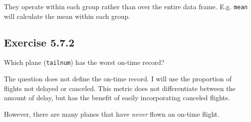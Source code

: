 \documentclass[]{book}
\newenvironment{Shaded}{\begin{snugshade}}{\end{snugshade}}
\newcommand{\CommentTok}[1]{\textcolor[rgb]{0.56,0.35,0.01}{\textit{#1}}}
\newcommand{\DataTypeTok}[1]{\textcolor[rgb]{0.13,0.29,0.53}{#1}}
\newcommand{\DecValTok}[1]{\textcolor[rgb]{0.00,0.00,0.81}{#1}}
\newcommand{\KeywordTok}[1]{\textcolor[rgb]{0.13,0.29,0.53}{\textbf{#1}}}
\newcommand{\NormalTok}[1]{#1}
\newcommand{\OperatorTok}[1]{\textcolor[rgb]{0.81,0.36,0.00}{\textbf{#1}}}
\newcommand{\StringTok}[1]{\textcolor[rgb]{0.31,0.60,0.02}{#1}}
\theoremstyle{plain}
\theoremstyle{remark}
\theoremstyle{definition}
\theoremstyle{definition}
\theoremstyle{definition}
\theoremstyle{remark}
\begin{document}
They operate within each group rather than over the entire data frame.
E.g. \texttt{mean} will calculate the mean within each group.

\hypertarget{exercise-5.7.2}{%
\subsection*{\texorpdfstring{Exercise
{5.7.2}}{Exercise 5.7.2}}\label{exercise-5.7.2}}

Which plane (\texttt{tailnum}) has the worst on-time record?

The question does not define the on-time record. I will use the
proportion of flights not delayed or canceled. This metric does not
differentiate between the amount of delay, but has the benefit of easily
incorporating canceled flights.

\begin{Shaded}
\end{Shaded}

However, there are many planes that have \emph{never} flown an on-time
flight.
\end{document}
